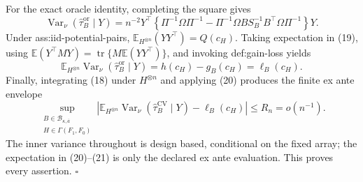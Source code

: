 For the exact oracle identity, completing the square gives
\[
 \operatorname{Var}_\nu(\widehat\tau_B^{\mathrm{or}}\mid Y)
 =n^{-2}Y^\top
 \left\{
 \Pi^{-1}\Omega\Pi^{-1}
 -\Pi^{-1}\Omega BS_B^{-1}B^\top\Omega\Pi^{-1}
 \right\}Y.
 \tag{19}
\]
Under ass:iid-potential-pairs, \(\mathbb E_{H^{\otimes n}}(YY^\top)=Q(c_H)\).  Taking expectation in (19), using \(\mathbb E(Y^\top MY)=\operatorname{tr}\{M\mathbb E(YY^\top)\}\), and invoking def:gain-loss yields
\[
 \mathbb E_{H^{\otimes n}}
 \operatorname{Var}_\nu(\widehat\tau_B^{\mathrm{or}}\mid Y)
 =h(c_H)-g_B(c_H)=\ell_B(c_H).
 \tag{20}
\]
Finally, integrating (18) under \(H^{\otimes n}\) and applying (20) produces the finite ex ante envelope
\[
 \sup_{\substack{B\in\mathcal B_{\kappa,\overline a}\\H\in\Gamma(F_1,F_0)}}
 \left|
 \mathbb E_{H^{\otimes n}}
 \operatorname{Var}_\nu(\widehat\tau_B^{\mathrm{CV}}\mid Y)
 -\ell_B(c_H)
 \right|
 \leq R_n=o(n^{-1}).
 \tag{21}
\]
The inner variance throughout is design based, conditional on the fixed array; the expectation in (20)--(21) is only the declared ex ante evaluation.  This proves every assertion. \(\square\)